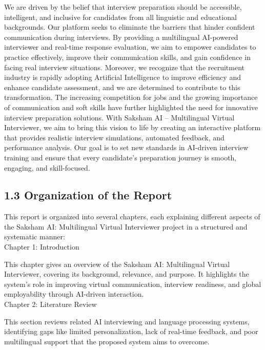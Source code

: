 \documentclass[12pt]{article}
\begin{document}
   \noindent We are driven by the belief that interview preparation should be accessible, intelligent, and inclusive for candidates from all linguistic and educational backgrounds. Our platform seeks to eliminate the barriers that hinder confident communication during interviews. By providing a multilingual AI-powered interviewer and real-time response evaluation, we aim to empower candidates to practice effectively, improve their communication skills, and gain confidence in facing real interview situations. Moreover, we recognize that the recruitment industry is rapidly adopting Artificial Intelligence to improve efficiency and enhance candidate assessment, and we are determined to contribute to this transformation. The increasing competition for jobs and the growing importance of communication and soft skills have further highlighted the need for innovative interview preparation solutions. With Saksham AI – Multilingual Virtual Interviewer, we aim to bring this vision to life by creating an interactive platform that provides realistic interview simulations, automated feedback, and performance analysis. Our goal is to set new standards in AI-driven interview training and ensure that every candidate’s preparation journey is smooth, engaging, and skill-focused. 
   \vspace{5pt}
   
\subsection{1.3 Organization of the Report}
\vspace{5pt}
\noindent This report is organized into several chapters, each explaining different aspects of the Saksham AI: Multilingual Virtual Interviewer project in a structured and systematic manner: \\[2pt]

\noindent Chapter 1: Introduction

\noindent This chapter gives an overview of the Saksham AI: Multilingual Virtual Interviewer, covering its background, relevance, and purpose. It highlights the system’s role in improving virtual communication, interview readiness, and global employability through AI-driven interaction.
 \\[2pt]

\noindent Chapter 2: Literature Review

\noindent  This section reviews related AI interviewing and language processing systems, identifying gaps like limited personalization, lack of real-time feedback, and poor multilingual support that the proposed system aims to overcome.
 \\[2pt]
\end{document}

